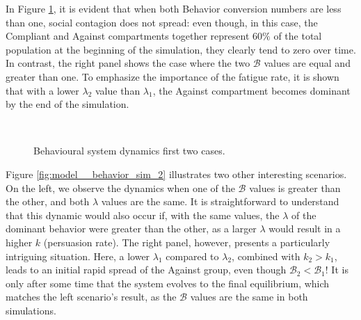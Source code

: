 In Figure \ref{fig:model__behavior_sim_1}, it is evident that when both Behavior conversion numbers are less than one, social contagion does not spread: even though, in this case, the Compliant and Against compartments together represent $60\%$ of the total population at the beginning of the simulation, they clearly tend to zero over time. In contrast, the right panel shows the case where the two $\mathcal{B}$ values are equal and greater than one. To emphasize the importance of the fatigue rate, it is shown that with a lower $\lambda_2$ value than $\lambda_1$, the Against compartment becomes dominant by the end of the simulation. 
\begin{figure}[h]
	\centering
	 \quad
	 \\
	\caption[Behavioural model simulation first]{Behavioural system dynamics first two cases.}
	\label{fig:model__behavior_sim_1}
\end{figure}
\label{subsec:model_behav}
Figure \ref{fig:model__behavior_sim_2} illustrates two other interesting scenarios. On the left, we observe the dynamics when one of the $\mathcal{B}$ values is greater than the other, and both $\lambda$ values are the same. It is straightforward to understand that this dynamic would also occur if, with the same values, the $\lambda$ of the dominant behavior were greater than the other, as a larger $\lambda$ would result in a higher $k$ (persuasion rate). The right panel, however, presents a particularly intriguing situation. Here, a lower $\lambda_1$ compared to $\lambda_2$, combined with $k_2 > k_1$, leads to an initial rapid spread of the Against group, even though $\mathcal{B}_2 < \mathcal{B}_1$! It is only after some time that the system evolves to the final equilibrium, which matches the left scenario's result, as the $\mathcal{B}$ values are the same in both simulations.

